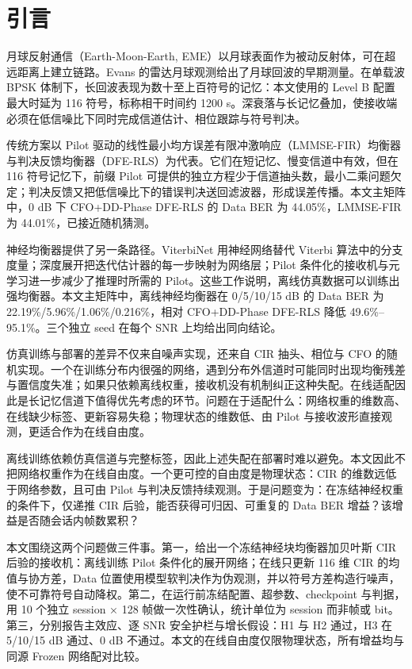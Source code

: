 \section{引言}

月球反射通信（Earth-Moon-Earth, EME）以月球表面作为被动反射体，可在超远距离上建立链路。Evans 的雷达月球观测给出了月球回波的早期测量\cite{evans1965}。在单载波 BPSK 体制下，长回波表现为数十至上百符号的记忆：本文使用的 Level B 配置最大时延为 116 符号，标称相干时间约 1200 s。深衰落与长记忆叠加，使接收端必须在低信噪比下同时完成信道估计、相位跟踪与符号判决。

传统方案以 Pilot 驱动的线性最小均方误差有限冲激响应（LMMSE-FIR）均衡器与判决反馈均衡器（DFE-RLS）为代表。它们在短记忆、慢变信道中有效，但在 116 符号记忆下，前缀 Pilot 可提供的独立方程少于信道抽头数，最小二乘问题欠定；判决反馈又把低信噪比下的错误判决送回滤波器，形成误差传播。本文主矩阵中，0 dB 下 CFO+DD-Phase DFE-RLS 的 Data BER 为 44.05\%，LMMSE-FIR 为 44.01\%，已接近随机猜测。

神经均衡器提供了另一条路径。ViterbiNet 用神经网络替代 Viterbi 算法中的分支度量\cite{shlezinger2020}；深度展开把迭代估计器的每一步映射为网络层\cite{hershey2014}；Pilot 条件化的接收机与元学习进一步减少了推理时所需的 Pilot\cite{park2021,cohen2022}。这些工作说明，离线仿真数据可以训练出强均衡器。本文主矩阵中，离线神经均衡器在 0/5/10/15 dB 的 Data BER 为 22.19\%/5.96\%/1.06\%/0.216\%，相对 CFO+DD-Phase DFE-RLS 降低 49.6\%–95.1\%。三个独立 seed 在每个 SNR 上均给出同向结论。

仿真训练与部署的差异不仅来自噪声实现，还来自 CIR 抽头、相位与 CFO 的随机实现。一个在训练分布内很强的网络，遇到分布外信道时可能同时出现均衡残差与置信度失准；如果只依赖离线权重，接收机没有机制纠正这种失配。在线适配因此是长记忆信道下值得优先考虑的环节。问题在于适配什么：网络权重的维数高、在线缺少标签、更新容易失稳；物理状态的维数低、由 Pilot 与接收波形直接观测，更适合作为在线自由度。

离线训练依赖仿真信道与完整标签，因此上述失配在部署时难以避免。本文因此不把网络权重作为在线自由度。一个更可控的自由度是物理状态：CIR 的维数远低于网络参数，且可由 Pilot 与判决反馈持续观测。于是问题变为：在冻结神经权重的条件下，仅递推 CIR 后验，能否获得可归因、可重复的 Data BER 增益？该增益是否随会话内帧数累积？

本文围绕这两个问题做三件事。第一，给出一个冻结神经块均衡器加贝叶斯 CIR 后验的接收机：离线训练 Pilot 条件化的展开网络；在线只更新 116 维 CIR 的均值与协方差，Data 位置使用模型软判决作为伪观测，并以符号方差构造行噪声，使不可靠符号自动降权。第二，在运行前冻结配置、超参数、checkpoint 与判据，用 10 个独立 session × 128 帧做一次性确认，统计单位为 session 而非帧或 bit。第三，分别报告主效应、逐 SNR 安全护栏与增长假设：H1 与 H2 通过，H3 在 5/10/15 dB 通过、0 dB 不通过。本文的在线自由度仅限物理状态，所有增益均与同源 Frozen 网络配对比较。

